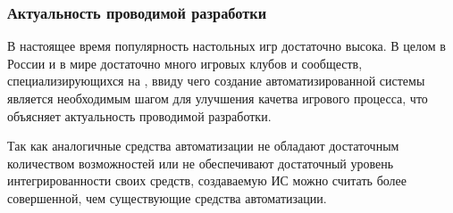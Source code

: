 \subsubsection{Актуальность проводимой разработки}

В настоящее время популярность настольных игр достаточно высока. В целом в России и в мире достаточно много игровых клубов и сообществ, специализирующихся на \dnd, ввиду чего создание автоматизированной системы является необходимым шагом для улучшения качетва игрового процесса, что объясняет актуальность проводимой разработки.

Так как аналогичные средства автоматизации не обладают достаточным количеством возможностей или не обеспечивают достаточный уровень интегрированности своих средств, создаваемую ИС можно считать более совершенной, чем существующие средства автоматизации.
